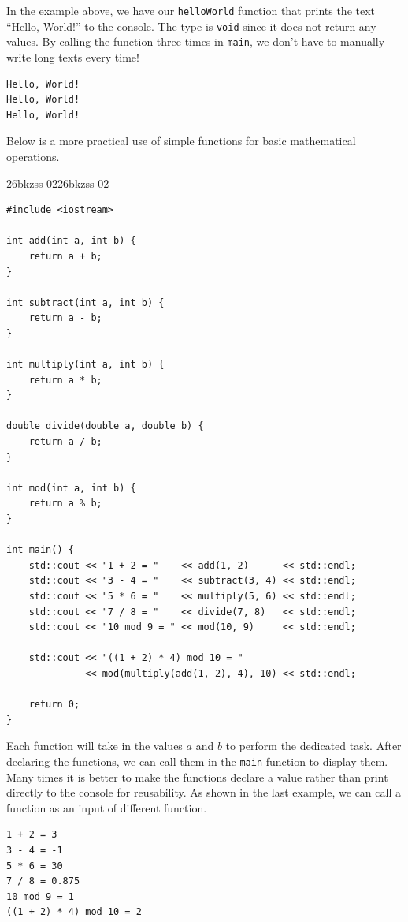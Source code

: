 \documentclass[../../../main.tex]{subfiles}
\begin{document}
In the example above, we have our \verb|helloWorld| function that
prints the text ``Hello, World!'' to the console. The type is
\verb|void| since it does not return any values. By calling the
function three times in \verb|main|, we don't have to manually
write long texts every time!

\begin{outputbox}
\begin{lstlisting}[style=basic]
Hello, World!
Hello, World!
Hello, World!
\end{lstlisting}
\end{outputbox}

Below is a more practical use of simple functions for basic
mathematical operations.

\begin{cppbox}{26bkzss-02}{26bkzss-02}
\begin{lstlisting}[style=cppstyle]
#include <iostream>

int add(int a, int b) {
    return a + b;
}

int subtract(int a, int b) {
    return a - b;
}

int multiply(int a, int b) {
    return a * b;
}

double divide(double a, double b) {
    return a / b;
}

int mod(int a, int b) {
    return a % b;
}

int main() {
    std::cout << "1 + 2 = "    << add(1, 2)      << std::endl;
    std::cout << "3 - 4 = "    << subtract(3, 4) << std::endl;
    std::cout << "5 * 6 = "    << multiply(5, 6) << std::endl;
    std::cout << "7 / 8 = "    << divide(7, 8)   << std::endl;
    std::cout << "10 mod 9 = " << mod(10, 9)     << std::endl;

    std::cout << "((1 + 2) * 4) mod 10 = "
              << mod(multiply(add(1, 2), 4), 10) << std::endl;

    return 0;
}
\end{lstlisting}
\end{cppbox}

Each function will take in the values $a$ and $b$ to perform the
dedicated task. After declaring the functions, we can call them in
the \verb|main| function to display them. Many times it is better
to make the functions declare a value rather than print directly
to the console for reusability. As shown in the last example,
we can call a function as an input of different function.

\begin{outputbox}
\begin{lstlisting}[style=basic]
1 + 2 = 3
3 - 4 = -1
5 * 6 = 30
7 / 8 = 0.875
10 mod 9 = 1
((1 + 2) * 4) mod 10 = 2
\end{lstlisting}
\end{outputbox}
\end{document}
